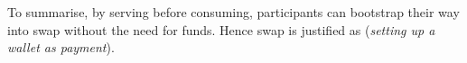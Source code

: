 


% 
% 
%

To summarise, by serving before consuming, participants can bootstrap their way into swap without the need for funds. Hence swap is justified as (\emph{setting up a wallet as payment}).
